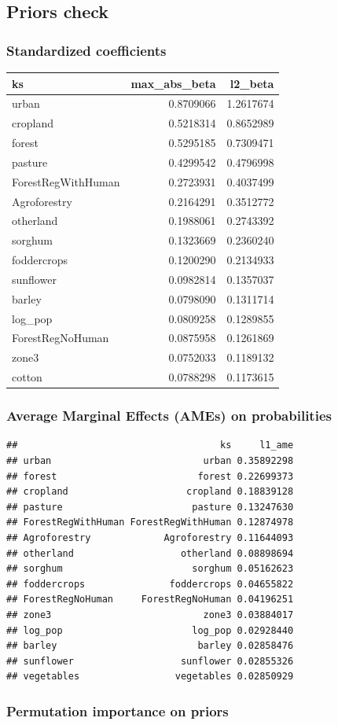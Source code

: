 \documentclass[
]{article}
\begin{document}
\subsection{Priors check}\label{priors-check}

\subsubsection{Standardized
coefficients}\label{standardized-coefficients}

\begin{longtable}[]{@{}lrr@{}}
\toprule\noalign{}
ks & max\_abs\_beta & l2\_beta \\
\midrule\noalign{}
\endhead
\bottomrule\noalign{}
\endlastfoot
urban & 0.8709066 & 1.2617674 \\
cropland & 0.5218314 & 0.8652989 \\
forest & 0.5295185 & 0.7309471 \\
pasture & 0.4299542 & 0.4796998 \\
ForestRegWithHuman & 0.2723931 & 0.4037499 \\
Agroforestry & 0.2164291 & 0.3512772 \\
otherland & 0.1988061 & 0.2743392 \\
sorghum & 0.1323669 & 0.2360240 \\
foddercrops & 0.1200290 & 0.2134933 \\
sunflower & 0.0982814 & 0.1357037 \\
barley & 0.0798090 & 0.1311714 \\
log\_pop & 0.0809258 & 0.1289855 \\
ForestRegNoHuman & 0.0875958 & 0.1261869 \\
zone3 & 0.0752033 & 0.1189132 \\
cotton & 0.0788298 & 0.1173615 \\
\end{longtable}

\subsubsection{Average Marginal Effects (AMEs) on
probabilities}\label{average-marginal-effects-ames-on-probabilities}

\begin{verbatim}
##                                    ks     l1_ame
## urban                           urban 0.35892298
## forest                         forest 0.22699373
## cropland                     cropland 0.18839128
## pasture                       pasture 0.13247630
## ForestRegWithHuman ForestRegWithHuman 0.12874978
## Agroforestry             Agroforestry 0.11644093
## otherland                   otherland 0.08898694
## sorghum                       sorghum 0.05162623
## foddercrops               foddercrops 0.04655822
## ForestRegNoHuman     ForestRegNoHuman 0.04196251
## zone3                           zone3 0.03884017
## log_pop                       log_pop 0.02928440
## barley                         barley 0.02858476
## sunflower                   sunflower 0.02855326
## vegetables                 vegetables 0.02850929
\end{verbatim}

\subsubsection{Permutation importance on
priors}\label{permutation-importance-on-priors}
\end{document}
